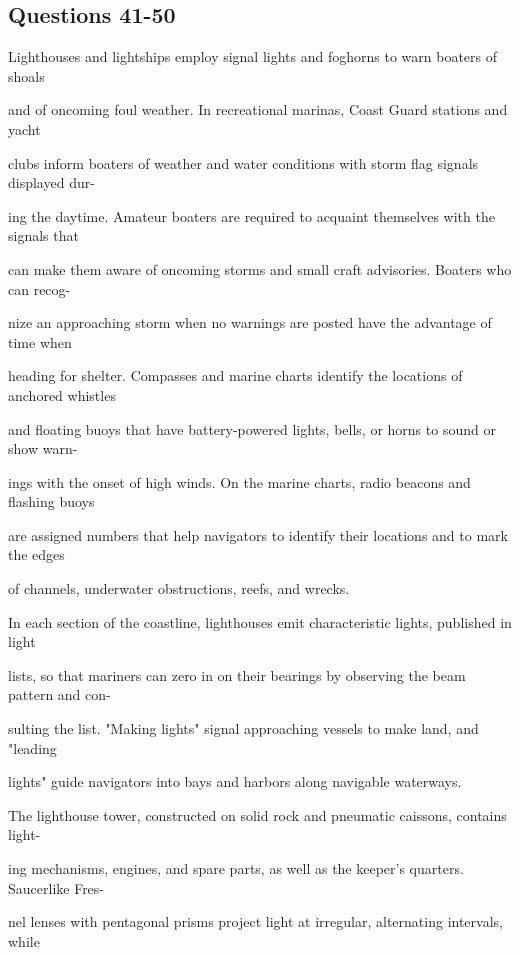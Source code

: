 \documentclass[12pt]{article}
\begin{document}
\subsection*{Questions 41-50}
\begingroup
\small
\sloppy
\setlength{\parskip}{0pt}
\setlength{\parindent}{0pt}
Lighthouses and lightships employ signal lights and foghorns to warn boaters of shoals\par
and of oncoming foul weather. In recreational marinas, Coast Guard stations and yacht\par
clubs inform boaters of weather and water conditions with storm flag signals displayed dur-\par
ing the daytime. Amateur boaters are required to acquaint themselves with the signals that\par
can make them aware of oncoming storms and small craft advisories. Boaters who can recog-\par
nize an approaching storm when no warnings are posted have the advantage of time when\par
heading for shelter. Compasses and marine charts identify the locations of anchored whistles\par
and floating buoys that have battery-powered lights, bells, or horns to sound or show warn-\par
ings with the onset of high winds. On the marine charts, radio beacons and flashing buoys\par
are assigned numbers that help navigators to identify their locations and to mark the edges\par
of channels, underwater obstructions, reefs, and wrecks.\par
In each section of the coastline, lighthouses emit characteristic lights, published in light\par
lists, so that mariners can zero in on their bearings by observing the beam pattern and con-\par
sulting the list. "Making lights" signal approaching vessels to make land, and "leading\par
lights" guide navigators into bays and harbors along navigable waterways.\par
The lighthouse tower, constructed on solid rock and pneumatic caissons, contains light-\par
ing mechanisms, engines, and spare parts, as well as the keeper's quarters. Saucerlike Fres-\par
nel lenses with pentagonal prisms project light at irregular, alternating intervals, while\par
\end{document}
